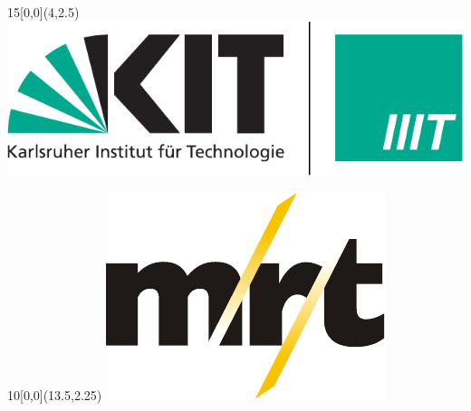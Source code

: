 
\newcommand{\diameter}{20}
\newcommand{\xone}{-15}
\newcommand{\xtwo}{160}
\newcommand{\yone}{15}
\newcommand{\ytwo}{-253}

\begin{titlepage}

	\begin{textblock}{15}[0,0](4,2.5)
		\includegraphics[width=.3\textwidth]{Graphics/Logos/KIT+IIIT-Logo.pdf}
	\end{textblock}

	\begin{textblock}{10}[0,0](13.5,2.25)
		\includegraphics[width=.25\textwidth]{Graphics/Logos/mrt.pdf}
	\end{textblock}


\end{titlepage}
